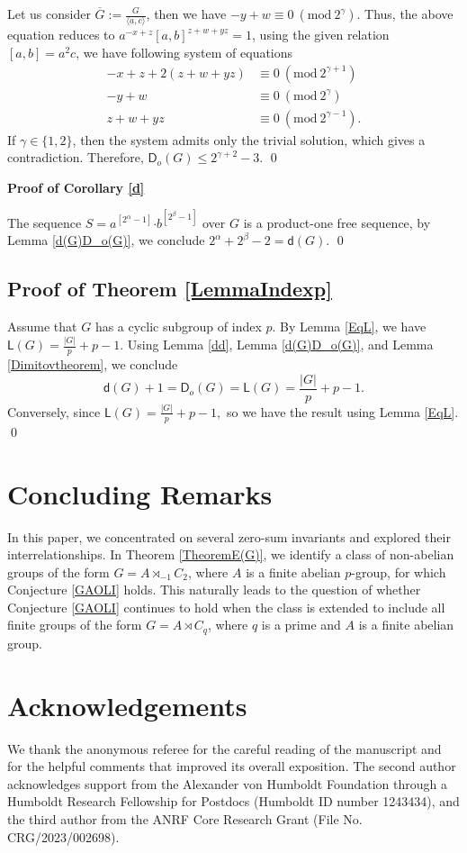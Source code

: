 \documentclass[a4paper,11pt]{article}
\numberwithin{equation}{section}
\newcommand{\bdot}{\boldsymbol{\cdot}}
\newcommand{\no}{\noindent}
\begin{document}
\begin{enumerate}[label={(\arabic*)}]
     
Let us consider $\overline{G}:=\frac{G}{\langle a,c\rangle}$, then we have $-y+w \equiv 0\ (\textrm{mod}\ 2^{\gamma})$. Thus, the above equation reduces to $a^{-x+z}[a,b]^{z+w+yz}=1$, using the  given relation $[a,b]=a^2 c$, we have following system of equations
 \begin{align*}
  -x+z+2(z+w+yz) &\equiv 0\ (\textrm{mod}\ 2^{\gamma  +1})\\ 
  -y+w & \equiv 0\ (\textrm{mod}\ 2^{\gamma}) \\ 
z+w+yz&\equiv 0\ (\textrm{mod}\ 2^{\gamma-1}).
\end{align*}
If $\gamma \in \{1,2\}$, then the system admits only the trivial solution, which gives a contradiction. Therefore, $\mathsf{D}_o(G) \le 2^{\gamma+2}-3.$ \qed

\end{enumerate}

\no \textbf{Proof of Corollary \ref{d}}

\no The sequence $S=a^{[2^{\alpha}-1]}\bdot b^{[2^{\beta}-1]}$ over $G$ is a product-one free sequence, by Lemma \ref{d(G)D_o(G)}, we conclude $2^\alpha +2^\beta-2 = \mathsf{d}(G)$. \qed
 
\subsection*{Proof of Theorem \ref{LemmaIndexp}}
Assume that $G$ has a cyclic subgroup of index $p$. By Lemma \ref{EqL}, we have $\mathsf{L}(G)=\frac{|G|}{p}+p-1$. Using Lemma \ref{dd}, Lemma \ref{d(G)D_o(G)}, and Lemma \ref{Dimitovtheorem}, we conclude 
$$\mathsf{d}(G)+1=\mathsf{D}_o(G)= \mathsf{L}(G)=\frac{|G|}{p}+p-1.$$
Conversely, since $\mathsf{L}(G)=\frac{|G|}{p}+p-1,$ so we have the result using Lemma \ref{EqL}. \qed

\section{Concluding Remarks}
In this paper, we concentrated on several zero-sum invariants and explored their interrelationships. In Theorem \ref{TheoremE(G)}, we identify a class of non-abelian groups of the form $G = A \rtimes_{-1} C_2$, where $A$ is a finite abelian $p$-group, for which Conjecture \ref{GAOLI} holds. This naturally leads to the question of whether Conjecture \ref{GAOLI} continues to hold when the class is extended to include all finite groups of the form $G = A \rtimes C_q$, where $q$ is a prime and $A$ is a finite abelian group. 
\section{Acknowledgements}
We thank the anonymous referee for the careful reading of the manuscript and for the helpful comments that improved its overall exposition. The second author acknowledges support from the Alexander von Humboldt Foundation through a Humboldt Research Fellowship for Postdocs (Humboldt ID number 1243434), and the third author from the ANRF Core Research Grant (File No. CRG/2023/002698).
\end{document}
